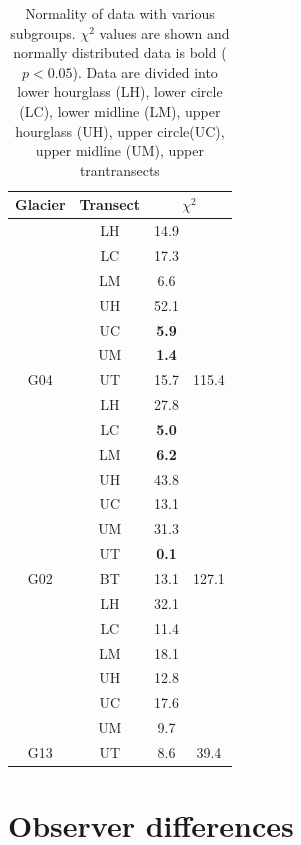 \documentclass[12pt]{article}
\begin{document}
\begin{table}
\centering
\caption{Normality of data with various subgroups. $\chi^2$ values are shown and normally distributed data is bold ($p<0.05$). Data are divided into lower hourglass (LH), lower circle (LC), lower midline (LM), upper hourglass (UH), upper circle(UC), upper midline (UM), upper trantransects}
\label{tab:normality}
\begin{tabular}{cccc}
\textbf{Glacier} & \textbf{Transect} & \multicolumn{2}{c}{\textbf{$\chi^2$}} \\ 
\hline
\hline 
& LH & 14.9 &   \\
  & LC & 17.3 &   \\
  & LM & 6.6 &   \\
  & UH & 52.1 &   \\
  & UC & \textbf{5.9} &   \\
& UM & \textbf{1.4} &   \\
\multirow{-7}{*}{G04} & UT & 15.7 & \multirow{-7}{*}{ 115.4} \\
 & LH & 27.8 &  \\ \hline
 & LC & \textbf{5.0} &  \\
 & LM & \textbf{6.2} &  \\
 & UH & 43.8 &  \\
 & UC & 13.1 &  \\
 & UM & 31.3 &  \\
 & UT & \textbf{0.1} &  \\
\multirow{-8}{*}{G02} & BT & 13.1 & \multirow{-8}{*}{127.1} \\
  
  & LH & 32.1 &   \\ \hline
  
  & LC & 11.4 &   \\
  
  & LM & 18.1 &   \\
  
  & UH & 12.8 &   \\
  
  & UC & 17.6 &   \\
  
  & UM & 9.7 &   \\
  
\multirow{-7}{*}{ G13} & UT & 8.6 & \multirow{-7}{*}{ 39.4}
\end{tabular}
\end{table}


\section{Observer differences}
\end{document}
